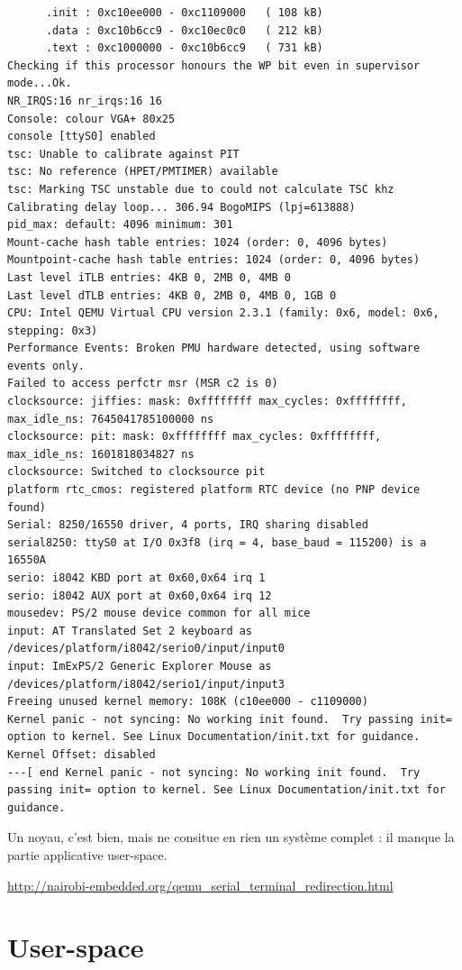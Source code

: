 \documentclass[a4paper]{article}
\begin{document}
\begin{verbatim}
      .init : 0xc10ee000 - 0xc1109000   ( 108 kB)
      .data : 0xc10b6cc9 - 0xc10ec0c0   ( 212 kB)
      .text : 0xc1000000 - 0xc10b6cc9   ( 731 kB)
Checking if this processor honours the WP bit even in supervisor mode...Ok.
NR_IRQS:16 nr_irqs:16 16
Console: colour VGA+ 80x25
console [ttyS0] enabled
tsc: Unable to calibrate against PIT
tsc: No reference (HPET/PMTIMER) available
tsc: Marking TSC unstable due to could not calculate TSC khz
Calibrating delay loop... 306.94 BogoMIPS (lpj=613888)
pid_max: default: 4096 minimum: 301
Mount-cache hash table entries: 1024 (order: 0, 4096 bytes)
Mountpoint-cache hash table entries: 1024 (order: 0, 4096 bytes)
Last level iTLB entries: 4KB 0, 2MB 0, 4MB 0
Last level dTLB entries: 4KB 0, 2MB 0, 4MB 0, 1GB 0
CPU: Intel QEMU Virtual CPU version 2.3.1 (family: 0x6, model: 0x6, stepping: 0x3)
Performance Events: Broken PMU hardware detected, using software events only.
Failed to access perfctr msr (MSR c2 is 0)
clocksource: jiffies: mask: 0xffffffff max_cycles: 0xffffffff, max_idle_ns: 7645041785100000 ns
clocksource: pit: mask: 0xffffffff max_cycles: 0xffffffff, max_idle_ns: 1601818034827 ns
clocksource: Switched to clocksource pit
platform rtc_cmos: registered platform RTC device (no PNP device found)
Serial: 8250/16550 driver, 4 ports, IRQ sharing disabled
serial8250: ttyS0 at I/O 0x3f8 (irq = 4, base_baud = 115200) is a 16550A
serio: i8042 KBD port at 0x60,0x64 irq 1
serio: i8042 AUX port at 0x60,0x64 irq 12
mousedev: PS/2 mouse device common for all mice
input: AT Translated Set 2 keyboard as /devices/platform/i8042/serio0/input/input0
input: ImExPS/2 Generic Explorer Mouse as /devices/platform/i8042/serio1/input/input3
Freeing unused kernel memory: 108K (c10ee000 - c1109000)
Kernel panic - not syncing: No working init found.  Try passing init= option to kernel. See Linux Documentation/init.txt for guidance.
Kernel Offset: disabled
---[ end Kernel panic - not syncing: No working init found.  Try passing init= option to kernel. See Linux Documentation/init.txt for guidance.
\end{verbatim}

Un noyau, c'est bien, mais ne consitue en rien un système complet : il manque la partie applicative user-space.

\url{http://nairobi-embedded.org/qemu_serial_terminal_redirection.html}

\part{User-space}
\end{document}
